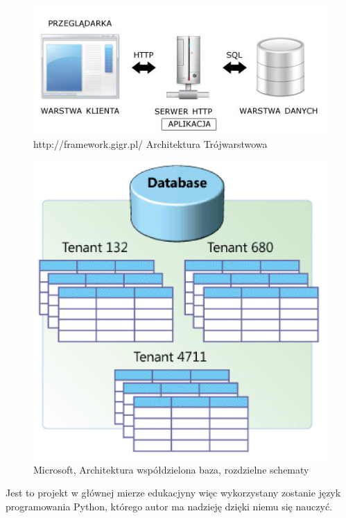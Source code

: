 \documentclass[a4paper,10pt, twoside]{report}
\begin{document}
\begin{large}
\begin{figure}[H]           %
    \centering  
    \includegraphics[width=12cm]{figures/framwork-gigr-pl_architektura_www.jpg}
    \caption{http://framework.gigr.pl/ Architektura Trójwarstwowa}
    \label{fig:architeturatrojwarstwowa}
\end{figure}

\begin{figure}[H]           %
    \centering  
    \includegraphics[width=12cm]{figures/multitenant_4.png}
    \caption{Microsoft, Architektura współdzielona baza, rozdzielne schematy}
    \label{fig:multitenant}
\end{figure}

\medskip
{Jest to projekt w głównej mierze edukacjyny więc wykorzystany zostanie język 
programowania Python\cite{Python}, którego autor ma nadzieję dzięki niemu się 
nauczyć.}


\end{large}
\end{document}
